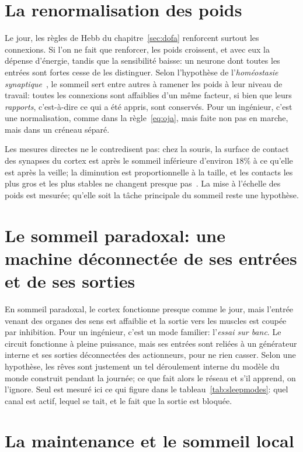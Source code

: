 \section{La renormalisation des poids}

Le jour, les règles de Hebb du chapitre~\ref{sec:dofa} renforcent surtout les connexions. Si l'on ne fait que renforcer, les poids croissent, et avec eux la dépense d'énergie, tandis que la sensibilité baisse: un neurone dont toutes les entrées sont fortes cesse de les distinguer. Selon l'hypothèse de l'\emph{homéostasie synaptique}~\cite{TononiCirelli2014}, le sommeil sert entre autres à ramener les poids à leur niveau de travail: toutes les connexions sont affaiblies d'un même facteur, si bien que leurs \emph{rapports}, c'est-à-dire ce qui a été appris, sont conservés. Pour un ingénieur, c'est une normalisation, comme dans la règle~\eqref{eq:oja}, mais faite non pas en marche, mais dans un créneau séparé.

Les mesures directes ne le contredisent pas: chez la souris, la surface de contact des synapses du cortex est après le sommeil inférieure d'environ $18\%$ à ce qu'elle est après la veille; la diminution est proportionnelle à la taille, et les contacts les plus gros et les plus stables ne changent presque pas~\cite{deVivo2017}. La mise à l'échelle des poids est mesurée; qu'elle soit la tâche principale du sommeil reste une hypothèse.

\section{Le sommeil paradoxal: une machine déconnectée de ses entrées et de ses sorties}

En sommeil paradoxal, le cortex fonctionne presque comme le jour, mais l'entrée venant des organes des sens est affaiblie et la sortie vers les muscles est coupée par inhibition. Pour un ingénieur, c'est un mode familier: l'\emph{essai sur banc}. Le circuit fonctionne à pleine puissance, mais ses entrées sont reliées à un générateur interne et ses sorties déconnectées des actionneurs, pour ne rien casser. Selon une hypothèse, les rêves sont justement un tel déroulement interne du modèle du monde construit pendant la journée; ce que fait alors le réseau et s'il apprend, on l'ignore. Seul est mesuré ici ce qui figure dans le tableau~\ref{tab:sleepmodes}: quel canal est actif, lequel se tait, et le fait que la sortie est bloquée.

\section{La maintenance et le sommeil local}

